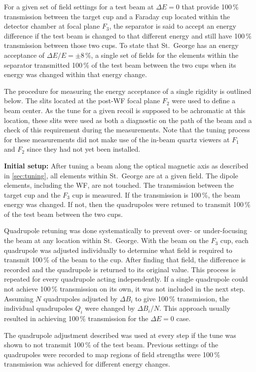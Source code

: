 For a given set of field settings for a test beam at $\Delta E = 0$ that
provide 100\,\% transmission between the target cup and a Faraday cup
located within the detector chamber at focal plane $F_3$, the separator
is said to accept an energy difference if the test beam is changed to
that different energy and still have 100\,\% transmission between those
two cups. To state that St.\ George has an energy acceptance of $\Delta
E/E = \pm 8$\,\%, a single set of fields for the elements within the
separator transmitted 100\,\% of the test beam between the two cups when
its energy was changed within that energy change.

The procedure for measuring the energy acceptance of a single rigidity
is outlined below. The slits located at the post-WF focal plane $F_2$
were used to define a beam center. As the tune for a given recoil is
supposed to be achromatic at this location, these slits were used as
both a diagnostic on the path of the beam and a check of this
requirement during the measurements. Note that the tuning process for
these measurements did not make use of the in-beam quartz viewers at
$F_1$ and $F_2$ since they had not yet been installed.

\textbf{Initial setup:}
After tuning a beam along the optical magnetic axis as described in
\ref{sec:tuning}, all elements within St.\ George are at a given field.
The dipole elements, including the WF, are not touched. The transmission
between the target cup and the $F_3$ cup is measured. If the
transmission is 100\,\%, the beam energy was changed. If not, then the
quadrupoles were retuned to transmit 100\,\% of the test beam between
the two cups.

Quadrupole retuning was done systematically to prevent over- or
under-focusing the beam at any location within St.\ George. With the
beam on the $F_3$ cup, each quadrupole was adjusted individually to
determine what field is required to transmit 100\,\% of the beam to the
cup. After finding that field, the difference is recorded and the
quadrupole is returned to its original value. This process is repeated
for every quadrupole acting independently. If a single quadrupole could
not achieve 100\,\% transmission on its own, it was not included in the
next step. Assuming $N$ quadrupoles adjusted by $\Delta B_i$ to give
100\,\% transmission, the individual quadrupoles $Q_i$ were changed by
$\Delta B_i / N$. This approach usually resulted in achieving 100\,\%
transmission for the $\Delta E = 0$ case.

The quadrupole adjustment described was used at every step if the tune
was shown to not transmit 100\,\% of the test beam. Previous settings of
the quadrupoles were recorded to map regions of field strengths were
100\,\% transmission was achieved for different energy changes.

